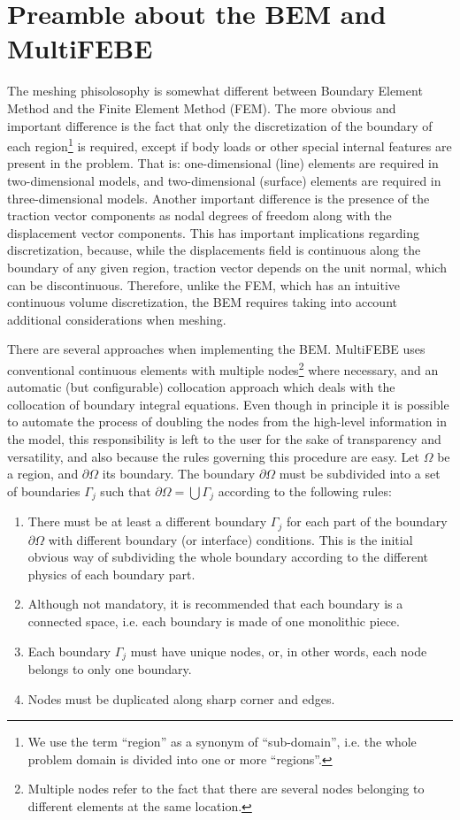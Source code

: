 \documentclass[A4]{article}
\begin{document}
\section{Preamble about the BEM and MultiFEBE}

The meshing phisolosophy is somewhat different between Boundary Element Method and the Finite Element Method (FEM). The more obvious and important difference is the fact that only the discretization of the boundary of each region\footnote{We use the term ``region'' as a synonym of ``sub-domain'', i.e. the whole problem domain is divided into one or more ``regions''.} is required, except if body loads or other special internal features are present in the problem. That is: one-dimensional (line) elements are required in two-dimensional models, and two-dimensional (surface) elements are required in three-dimensional models. Another important difference is the presence of the traction vector components as nodal degrees of freedom along with the displacement vector components. This has important implications regarding discretization, because, while the displacements field is continuous along the boundary of any given region, traction vector depends on the unit normal, which can be discontinuous. Therefore, unlike the FEM, which has an intuitive continuous volume discretization, the BEM requires taking into account additional considerations when meshing.

There are several approaches when implementing the BEM. MultiFEBE uses conventional continuous elements with multiple nodes\footnote{Multiple nodes refer to the fact that there are several nodes belonging to different elements at the same location.} where necessary, and an automatic (but configurable) collocation approach which deals with the collocation of boundary integral equations. Even though in principle it is possible to automate the process of doubling the nodes from the high-level information in the model, this responsibility is left to the user for the sake of transparency and versatility, and also because the rules governing this procedure are easy. Let $\Omega$ be a region, and $\partial\Omega$ its boundary. The boundary $\partial\Omega$ must be subdivided into a set of boundaries $\Gamma_j$ such that $\partial\Omega=\bigcup\Gamma_j$ according to the following rules:

\begin{enumerate}
    \item There must be at least a different boundary $\Gamma_j$ for each part of the boundary $\partial\Omega$ with different boundary (or interface) conditions. This is the initial obvious way of subdividing the whole boundary according to the different physics of each boundary part.
    \item Although not mandatory, it is recommended that each boundary is a connected space, i.e. each boundary is made of one monolithic piece.
    \item Each boundary $\Gamma_j$ must have unique nodes, or, in other words, each node belongs to only one boundary.
    \item Nodes must be duplicated along sharp corner and edges. 
\end{enumerate}
\end{document}
